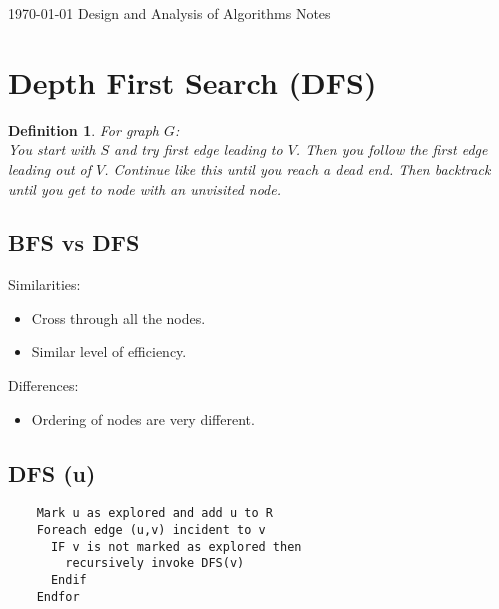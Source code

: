 \documentclass[12pt]{article}
\newtheorem*{defn}{Definition}
\begin{document}
\TabPositions{4cm}
 
\today {} Design and Analysis of Algorithms Notes\\

\section{Depth First Search (DFS)}
\begin{defn}
For graph $G$:\\
You start with $S$ and try first edge leading to $V$. Then you follow the first edge leading out of $V$. Continue like this until you reach a dead end. Then backtrack until you get to node with an unvisited node.
\end{defn}
\subsection{BFS vs DFS}
Similarities:
	\begin{itemize}
	\item Cross through all the nodes.
	\item Similar level of efficiency.
	\end{itemize}
Differences:
	\begin{itemize}
	\item Ordering of nodes are very different.
	\end{itemize}

\subsection{DFS (u)}
	\begin{verbatim}
	Mark u as explored and add u to R
	Foreach edge (u,v) incident to v
	  IF v is not marked as explored then
	    recursively invoke DFS(v)
	  Endif
	Endfor
	\end{verbatim}
\end{document}
